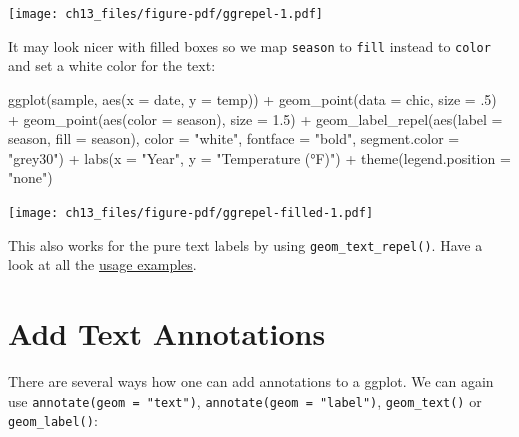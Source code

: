 \documentclass[
  letterpaper,
  DIV=11,
  numbers=noendperiod]{scrreprt}
\newenvironment{Shaded}{\begin{snugshade}}{\end{snugshade}}
\newcommand{\AttributeTok}[1]{\textcolor[rgb]{0.40,0.45,0.13}{#1}}
\newcommand{\DecValTok}[1]{\textcolor[rgb]{0.68,0.00,0.00}{#1}}
\newcommand{\FloatTok}[1]{\textcolor[rgb]{0.68,0.00,0.00}{#1}}
\newcommand{\FunctionTok}[1]{\textcolor[rgb]{0.28,0.35,0.67}{#1}}
\newcommand{\NormalTok}[1]{\textcolor[rgb]{0.00,0.23,0.31}{#1}}
\newcommand{\SpecialCharTok}[1]{\textcolor[rgb]{0.37,0.37,0.37}{#1}}
\newcommand{\StringTok}[1]{\textcolor[rgb]{0.13,0.47,0.30}{#1}}
\begin{document}
\texttt{[image: ch13\_files/figure-pdf/ggrepel-1.pdf]}

It may look nicer with filled boxes so we map \texttt{season} to
\texttt{fill} instead to \texttt{color} and set a white color for the
text:

\begin{Shaded}
\begin{Highlighting}[]
\FunctionTok{ggplot}\NormalTok{(sample, }\FunctionTok{aes}\NormalTok{(}\AttributeTok{x =}\NormalTok{ date, }\AttributeTok{y =}\NormalTok{ temp)) }\SpecialCharTok{+}
  \FunctionTok{geom\_point}\NormalTok{(}\AttributeTok{data =}\NormalTok{ chic, }\AttributeTok{size =}\NormalTok{ .}\DecValTok{5}\NormalTok{) }\SpecialCharTok{+}
  \FunctionTok{geom\_point}\NormalTok{(}\FunctionTok{aes}\NormalTok{(}\AttributeTok{color =}\NormalTok{ season), }\AttributeTok{size =} \FloatTok{1.5}\NormalTok{) }\SpecialCharTok{+}
  \FunctionTok{geom\_label\_repel}\NormalTok{(}\FunctionTok{aes}\NormalTok{(}\AttributeTok{label =}\NormalTok{ season, }\AttributeTok{fill =}\NormalTok{ season),}
                   \AttributeTok{color =} \StringTok{"white"}\NormalTok{, }\AttributeTok{fontface =} \StringTok{"bold"}\NormalTok{,}
                   \AttributeTok{segment.color =} \StringTok{"grey30"}\NormalTok{) }\SpecialCharTok{+}
  \FunctionTok{labs}\NormalTok{(}\AttributeTok{x =} \StringTok{"Year"}\NormalTok{, }\AttributeTok{y =} \StringTok{"Temperature (°F)"}\NormalTok{) }\SpecialCharTok{+}
  \FunctionTok{theme}\NormalTok{(}\AttributeTok{legend.position =} \StringTok{"none"}\NormalTok{)}
\end{Highlighting}
\end{Shaded}

\texttt{[image: ch13\_files/figure-pdf/ggrepel-filled-1.pdf]}

This also works for the pure text labels by using
\texttt{geom\_text\_repel()}. Have a look at all the
\href{https://ggrepel.slowkow.com/articles/examples.html}{usage
examples}.

\section{Add Text Annotations}\label{add-text-annotations}

There are several ways how one can add annotations to a ggplot. We can
again use \texttt{annotate(geom\ =\ "text")},
\texttt{annotate(geom\ =\ "label")}, \texttt{geom\_text()} or
\texttt{geom\_label()}:
\end{document}
